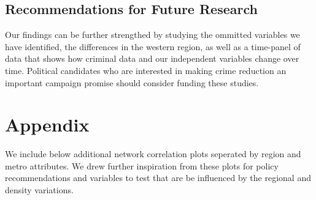 \documentclass[]{article}
\newenvironment{Shaded}{}{}
\newcommand{\CommentTok}[1]{\textcolor[rgb]{0.00,0.50,0.00}{#1}}
\newcommand{\DataTypeTok}[1]{#1}
\newcommand{\DecValTok}[1]{#1}
\newcommand{\KeywordTok}[1]{\textcolor[rgb]{0.00,0.00,1.00}{#1}}
\newcommand{\NormalTok}[1]{#1}
\newcommand{\OperatorTok}[1]{#1}
\newcommand{\StringTok}[1]{\textcolor[rgb]{0.00,0.50,0.50}{#1}}
\begin{document}
\hypertarget{recommendations-for-future-research}{%
\subsection{Recommendations for Future
Research}\label{recommendations-for-future-research}}

Our findings can be further strengthed by studying the ommitted
variables we have identified, the differences in the western region, as
well as a time-panel of data that shows how criminal data and our
independent variables change over time. Political candidates who are
interested in making crime reduction an important campaign promise
should consider funding these studies.

\hypertarget{appendix}{%
\section{Appendix}\label{appendix}}

We include below additional network correlation plots seperated by
region and metro attributes. We drew further inspiration from these
plots for policy recommendations and variables to test that are be
influenced by the regional and density variations.

\begin{Shaded}
\end{Shaded}
\end{document}
